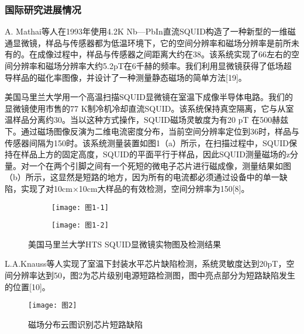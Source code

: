\documentclass[a4paper,12pt，twoside]{ctexart}
\begin{document}
	\subsubsection{国际研究进展情况}
	A. Mathai等人在1993年使用4.2K Nb—PbIn直流SQUID构造了一种新型的一维磁通显微镜，样品与传感器都为低温环境下，它的空间分辨率和磁场分辨率是前所未有的。在成像过程中，样品与传感器之间距离大约在38。该系统实现了66左右的空间分辨率和磁场分辨率大约5.2pT在6千赫的频率。我们利用显微镜获得了低场超导样品的磁化率图像，并设计了一种测量静态磁场的简单方法[19]。\par
	美国马里兰大学用一个高温扫描SQUID显微镜在室温下成像半导体电路。我们的显微镜使用市售的77 K制冷机冷却直流SQUID。该系统保持真空隔离，它与从室温样品分离约30。当以这种方式操作，SQUID磁场灵敏度为有20 pT 在500赫兹下。通过磁场图像反演为二维电流密度分布，当前空间分辨率定位到36时，样品与传感器间隔为150时。该系统测量装置如图1（a）所示，在扫描过程中，SQUID保持在样品上方的固定高度，SQUID的平面平行于样品，因此SQUID测量磁场的z分量。对一个在两个引脚之间有一个死短的微电子芯片进行磁成像，测量结果如图（b）所示，这显然是短路的地方，因为所有的电流都必须通过设备中的单一缺陷，实现了对10cm×10cm大样品的有效检测，空间分辨率为150[8]。\par
	
	\begin{figure}[htbp]
		\centering
		\begin{subfigure}{0.45\textwidth}
			\texttt{[image: 图1-1]}
		\end{subfigure}
		\hfill %
		\begin{subfigure}{0.45\textwidth}
			\texttt{[image: 图1-2]}
		\end{subfigure}
		\caption{美国马里兰大学HTS SQUID显微镜实物图及检测结果}\label{图1}
	\end{figure}
	
	
	L.A.Knauss等人实现了室温下封装水平芯片缺陷检测，系统灵敏度达到20pT，空间分辨率达到50，图2为芯片级别电源短路检测图，图中亮点部分为短路缺陷发生的位置[10]。\par
	
		\begin{figure}[htbp]
		\centering
		\texttt{[image: 图2]}
		\caption{磁场分布云图识别芯片短路缺陷}\label{图2}
		\end{figure}
	
\end{document}
